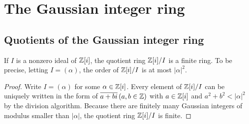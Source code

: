 \section{The Gaussian integer ring}

\subsection{Quotients of the Gaussian integer ring}
\begin{obs}
    If $I$ is a nonzero ideal of ${\mathbb{Z}}[i]$, the quotient ring ${\mathbb{Z}}[i]/I$ is a finite ring.
    To be precise, letting $I=(\alpha)$, the order of ${\mathbb{Z}}[i]/I$ is at most $|\alpha|^2$.
\end{obs}
\begin{proof}
    Write $I=(\alpha)$ for some $\alpha\in{\mathbb{Z}}[i]$.
    Every element of ${\mathbb{Z}}[i]/I$ can be uniquely written in the form of $\overline{a+bi}\,(a, b\in{\mathbb{Z}})$ with $a\in{\mathbb{Z}}[i]$ and $a^2+b^2<|\alpha|^2$ by the division algorithm.
    Because there are finitely many Gaussian integers of modulus smaller than $|\alpha|$, the quotient ring ${\mathbb{Z}}[i]/I$ is finite.
\end{proof}


